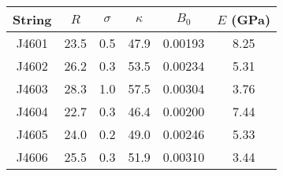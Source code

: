 \begin{tabular}{cccccc}
\toprule
String & $R$ & $\sigma$ & $\kappa$ & $B_0$ & $E$ (GPa) \\
\midrule
J4601 & 23.5 & 0.5 & 47.9 & 0.00193 & 8.25 \\
J4602 & 26.2 & 0.3 & 53.5 & 0.00234 & 5.31 \\
J4603 & 28.3 & 1.0 & 57.5 & 0.00304 & 3.76 \\
J4604 & 22.7 & 0.3 & 46.4 & 0.00200 & 7.44 \\
J4605 & 24.0 & 0.2 & 49.0 & 0.00246 & 5.33 \\
J4606 & 25.5 & 0.3 & 51.9 & 0.00310 & 3.44 \\
\bottomrule
\end{tabular}

